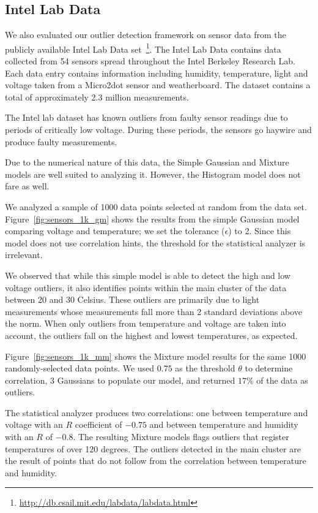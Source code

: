 \subsection{Intel Lab Data}
\label{sec:intel-lab-data-evaluation}

We also evaluated our outlier detection framework on sensor data from the publicly available Intel Lab Data set~\footnote{\url{http://db.csail.mit.edu/labdata/labdata.html}}. The Intel Lab Data contains data collected from 54 sensors spread throughout the Intel Berkeley Research Lab. Each data entry contains information including humidity, temperature, light and voltage taken from a Micro2dot sensor and weatherboard. The dataset contains a total of approximately 2.3 million measurements.

The Intel lab dataset has known outliers from faulty sensor readings due to periods of critically low voltage. During these periods, the sensors go haywire and produce faulty measurements.

Due to the numerical nature of this data, the Simple Gaussian and Mixture models are well suited to analyzing it. However, the Histogram model does not fare as well.

We analyzed a sample of 1000 data points selected at random from the data set. Figure~\ref{fig:sensors_1k_gm} shows the results from the simple Gaussian model comparing voltage and temperature; we set the tolerance ($\epsilon$) to 2. Since this model does not use correlation hints, the threshold for the statistical analyzer is irrelevant.

We observed that while this simple model is able to detect the high and low voltage outliers, it also identifies points within the main cluster of the data between 20 and 30 Celsius. These outliers are primarily due to light measurements whose measurements fall more than 2 standard deviations above the norm. When only outliers from temperature and voltage are taken into account, the outliers fall on the highest and lowest temperatures, as expected.

Figure~\ref{fig:sensors_1k_mm} shows the Mixture model results for the same 1000 randomly-selected data points. We used $0.75$ as the threshold $\theta$ to determine correlation, 3 Gaussians to populate our model, and returned $17\%$ of the data as outliers.

The statistical analyzer produces two correlations: one between temperature and voltage with an $R$ coefficient of $-0.75$ and between temperature and humidity with an $R$ of $-0.8$. The resulting Mixture models flags outliers that register temperatures of over 120 degrees. The outliers detected in the main cluster are the result of points that do not follow from the correlation between temperature and humidity.

